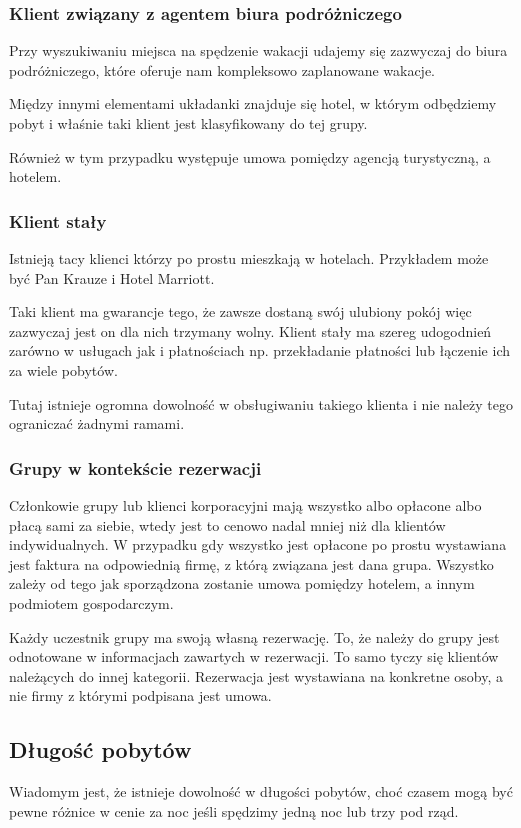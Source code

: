 \documentclass[a4paper,onecolumn,oneside,11pt,wide,floatssmall]{mwrep}
\theoremstyle{definition}
\theoremstyle{plain}%
\theoremstyle{remark}
\begin{document}
\subsubsection{Klient związany z agentem biura podróżniczego}
Przy wyszukiwaniu miejsca na spędzenie wakacji udajemy się zazwyczaj do biura
podróżniczego, które oferuje nam kompleksowo zaplanowane wakacje.

Między innymi elementami układanki znajduje się hotel, w którym odbędziemy pobyt
i właśnie taki klient jest klasyfikowany do tej grupy.

Również w tym przypadku występuje umowa pomiędzy agencją turystyczną, a hotelem.

\subsubsection{Klient stały}
Istnieją tacy klienci którzy po prostu mieszkają w hotelach. Przykładem może być
Pan Krauze i Hotel Marriott.  

Taki klient ma gwarancje tego, że zawsze dostaną
swój ulubiony pokój więc zazwyczaj jest on dla nich trzymany wolny. Klient stały
ma szereg udogodnień zarówno w usługach jak i płatnościach np. przekładanie
płatności lub łączenie ich za wiele pobytów.

Tutaj istnieje ogromna dowolność w obsługiwaniu takiego klienta i nie należy
tego ograniczać żadnymi ramami.

\subsubsection{Grupy w kontekście rezerwacji}
Członkowie grupy lub klienci korporacyjni mają wszystko albo opłacone 
albo płacą sami za siebie, wtedy jest to cenowo nadal mniej niż dla klientów 
indywidualnych. W przypadku gdy wszystko jest opłacone po prostu
wystawiana jest faktura na odpowiednią firmę, z którą związana jest dana
grupa. Wszystko zależy od tego jak sporządzona zostanie umowa pomiędzy hotelem,
a innym podmiotem gospodarczym.

Każdy uczestnik grupy ma swoją własną rezerwację. To, że należy do grupy jest 
odnotowane w informacjach zawartych w rezerwacji. To samo tyczy się klientów 
należących do innej kategorii. Rezerwacja jest wystawiana na konkretne osoby, 
a nie firmy z którymi podpisana jest umowa.

\subsection{Długość pobytów}
Wiadomym jest, że istnieje dowolność w długości pobytów, choć czasem mogą być
pewne różnice w cenie za noc jeśli spędzimy jedną noc lub trzy pod rząd.
\end{document}
